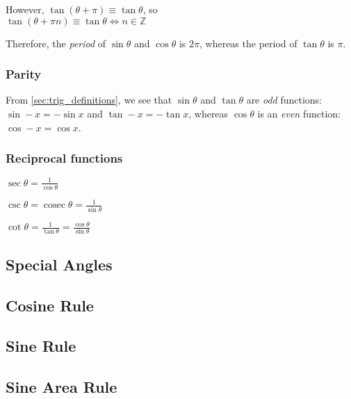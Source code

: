 \documentclass[a4paper,11pt]{article}
\begin{document}
    However, $\tan(\theta + \pi) \equiv \tan \theta$, so
    \\$\tan(\theta + \pi n) \equiv \tan \theta \iff n \in \mathbb{Z}$

    Therefore, the \textit{period} of $\sin \theta$ and $\cos \theta$ is $2\pi$,
    whereas the period of $\tan \theta$ is $\pi$.

    \subsubsection{Parity} \label{sec:trig_parity}

    From \ref{sec:trig_definitions}, we see that $\sin \theta$ and $\tan \theta$
    are \textit{odd} functions:
    \\$\sin -x = -\sin x$ and $\tan -x = -\tan x$,
    whereas $\cos \theta$ is an \textit{even} function:
    \\$\cos -x = \cos x$.

    \subsubsection{Reciprocal functions} \label{sec:trig_reciprocal}

    $\displaystyle\sec \theta = \frac{1}{\cos \theta}$

    $\displaystyle\csc \theta = \operatorname{cosec} \theta
        = \frac{1}{\sin \theta}$

    $\displaystyle\cot \theta = \frac{1}{\tan \theta}
        = \frac{\cos \theta}{\sin \theta}$

    \subsection{Special Angles}


    \subsection{Cosine Rule}

    \subsection{Sine Rule}

    \subsection{Sine Area Rule}
\end{document}
